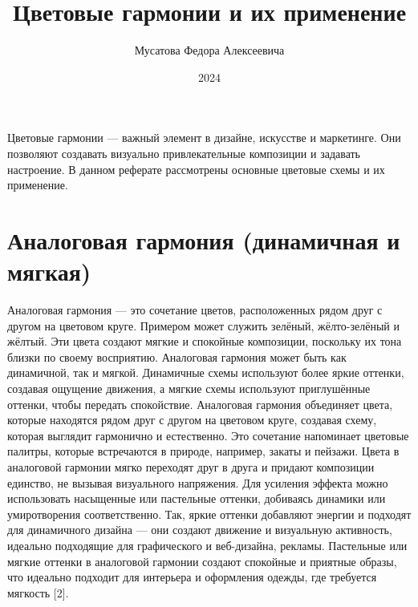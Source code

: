 \documentclass[bachelor, och, referat]{SCWorks}
\begin{document}

\title{Цветовые гармонии и их применение}




\author{Мусатова Федора Алексеевича}



\date{2024}

\maketitle

\tableofcontents

\newpage

\intro
Цветовые гармонии — важный элемент в дизайне, искусстве и маркетинге. Они позволяют создавать визуально привлекательные композиции и задавать настроение. В данном реферате рассмотрены основные цветовые схемы и их применение.

\section{Аналоговая гармония (динамичная и мягкая)}
Аналоговая гармония — это сочетание цветов, расположенных рядом друг с другом на цветовом круге. Примером может служить зелёный, жёлто-зелёный и жёлтый. Эти цвета создают мягкие и спокойные композиции, поскольку их тона близки по своему восприятию. Аналоговая гармония может быть как динамичной, так и мягкой. Динамичные схемы используют более яркие оттенки, создавая ощущение движения, а мягкие схемы используют приглушённые оттенки, чтобы передать спокойствие.
Аналоговая гармония объединяет цвета, которые находятся рядом друг с другом на цветовом круге, создавая схему, которая выглядит гармонично и естественно. Это сочетание напоминает цветовые палитры, которые встречаются в природе, например, закаты и пейзажи. Цвета в аналоговой гармонии мягко переходят друг в друга и придают композиции единство, не вызывая визуального напряжения.
Для усиления эффекта можно использовать насыщенные или пастельные оттенки, добиваясь динамики или умиротворения соответственно. Так, яркие оттенки добавляют энергии и подходят для динамичного дизайна — они создают движение и визуальную активность, идеально подходящие для графического и веб-дизайна, рекламы. Пастельные или мягкие оттенки в аналоговой гармонии создают спокойные и приятные образы, что идеально подходит для интерьера и оформления одежды, где требуется мягкость [2].
\end{document}
